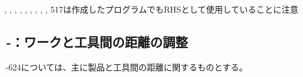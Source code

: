 \begin{marker}
, , , , , , , , , \ttNum517は作成したプログラムでもRHSとして使用していることに注意
\end{marker}



\clearpage


\subsection{\,-：ワークと工具間の距離の調整}
\,-\ttNum624については、主に製品と工具間の距離に関するものとする。\\

